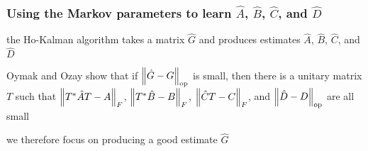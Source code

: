 \begin{frame}
\frametitle{Using the Markov parameters to learn
  $\hat A$, $\hat B$, $\hat C$, and $\hat D$}
the Ho-Kalman algorithm takes a matrix $\hat G$
and produces estimates $\hat A$, $\hat B$, $\hat C$, and $\hat D$

Oymak and Ozay show that
if $\left\Vert{\hat G - G}\right\Vert_{\text{op}}$ is small,
then there is a unitary matrix $T$ such that
$\left\Vert{T^\ast \hat A T - A}\right\Vert_F$,
$\left\Vert{T^\ast \hat B - B}\right\Vert_F$,
$\left\Vert{\hat C T - C}\right\Vert_F$,
and $\left\Vert{\hat D - D}\right\Vert_{\text{op}}$
are all small

we therefore focus on producing a good estimate $\hat G$
\end{frame}
